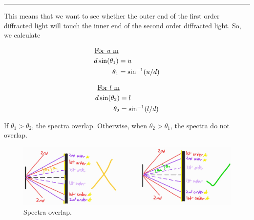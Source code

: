 \documentclass[oneside]{book}
\begin{document}
\begin{itemize}
\begin{example}{}{}
        \rule{20cm-137.0549pt-25pt}{0.05mm}
        This means that we want to see whether the outer end of the first order diffracted light will touch the inner end of the second order diffracted light. So, we calculate\vspace{-1em}
        \begin{center}
            \begin{minipage}{0.25\textwidth}
                    \begin{align*}
                        \text{\underline{For \(u\) m}}&\\
                        d\sin(\theta_1)&=u\\
                        \theta_1&=\sin^{-1}(u/d)
                    \end{align*}
            \end{minipage}\hspace{2cm}
            \begin{minipage}{0.25\textwidth}
                    \begin{align*}
                        \text{\underline{For \(l\) m}}&\\
                        d\sin(\theta_2)&=l\\
                        \theta_2&=\sin^{-1}(l/d)
                    \end{align*}
            \end{minipage}
        \end{center}
        If \(\theta_1>\theta_2\), the spectra overlap. Otherwise, when \(\theta_2>\theta_1\), the spectra do not overlap.
        \begin{figure}[H]
            \centering
            \includegraphics[width=\textwidth]{../images/spectra-overlap.jpg}
            \caption{Spectra overlap.}
            \label{fig:spectra-overlap}
        \end{figure}
    \end{example}
\end{itemize}
\end{document}
